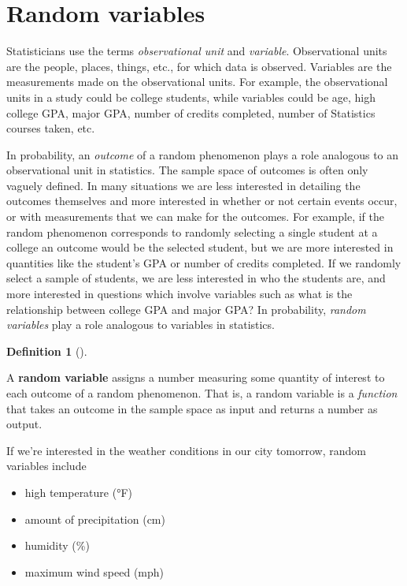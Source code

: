 \documentclass[
  letterpaper,
  DIV=11,
  numbers=noendperiod]{scrreprt}
\providecommand{\tightlist}{%
  \setlength{\itemsep}{0pt}\setlength{\parskip}{0pt}}
\theoremstyle{plain}
\theoremstyle{definition}
\theoremstyle{definition}
\theoremstyle{definition}
\newtheorem{definition}{Definition}[chapter]
\theoremstyle{remark}
\begin{document}
\section{Random variables}\label{sec-rv}

Statisticians use the terms \emph{observational unit} and
\emph{variable}. Observational units are the people, places, things,
etc., for which data is observed. Variables are the measurements made on
the observational units. For example, the observational units in a study
could be college students, while variables could be age, high college
GPA, major GPA, number of credits completed, number of Statistics
courses taken, etc.

In probability, an \emph{outcome} of a random phenomenon plays a role
analogous to an observational unit in statistics. The sample space of
outcomes is often only vaguely defined. In many situations we are less
interested in detailing the outcomes themselves and more interested in
whether or not certain events occur, or with measurements that we can
make for the outcomes. For example, if the random phenomenon corresponds
to randomly selecting a single student at a college an outcome would be
the selected student, but we are more interested in quantities like the
student's GPA or number of credits completed. If we randomly select a
sample of students, we are less interested in who the students are, and
more interested in questions which involve variables such as what is the
relationship between college GPA and major GPA? In probability,
\emph{random variables} play a role analogous to variables in
statistics.

\begin{definition}[]\protect\hypertarget{def-random-variable}{}\label{def-random-variable}

A \textbf{random variable} assigns a number
measuring some quantity of interest to each outcome of a random
phenomenon. That is, a random variable is a \emph{function} that takes
an outcome in the sample space as input and returns a number as output.

\end{definition}

If we're interested in the weather conditions in our city tomorrow,
random variables include

\begin{itemize}
\tightlist
\item
  high temperature (°F)
\item
  amount of precipitation (cm)
\item
  humidity (\%)
\item
  maximum wind speed (mph)
\end{itemize}
\end{document}
